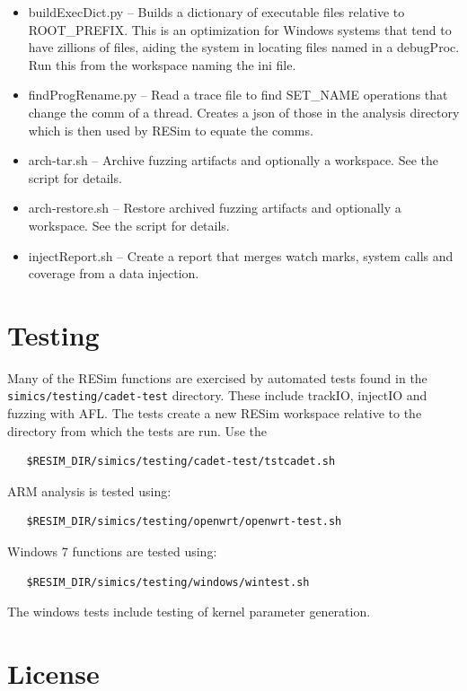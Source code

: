 \documentclass[titlepage]{article}
\begin{document}
\begin{itemize}
\item buildExecDict.py -- Builds a dictionary of executable files relative to ROOT\_PREFIX.  This is an optimization for Windows systems that tend to have zillions of
files, aiding the system in locating files named in a debugProc.  Run this from the workspace naming the ini file.
\item findProgRename.py -- Read a trace file to find SET\_NAME operations that change the comm of a thread.  Creates a json of those in the analysis directory
which is then used by RESim to equate the comms.
\item arch-tar.sh -- Archive fuzzing artifacts and optionally a workspace.  See the script for details.
\item arch-restore.sh -- Restore archived fuzzing artifacts and optionally a workspace.  See the script for details.
\item injectReport.sh -- Create a report that merges watch marks, system calls and coverage from a data injection.

\end{itemize}

\section{Testing}
Many of the RESim functions are exercised by automated tests found in the {\tt simics/testing/cadet-test} directory.
These include trackIO, injectIO and fuzzing with AFL.  The tests create a new RESim workspace relative to
the directory from which the tests are run.  Use the
\begin{verbatim}
   $RESIM_DIR/simics/testing/cadet-test/tstcadet.sh
\end{verbatim}
ARM analysis is tested using:
\begin{verbatim}
   $RESIM_DIR/simics/testing/openwrt/openwrt-test.sh
\end{verbatim}
Windows 7 functions are tested using:
\begin{verbatim}
   $RESIM_DIR/simics/testing/windows/wintest.sh
\end{verbatim}
The windows tests include testing of kernel parameter generation.

\section{License}
\end{document}
